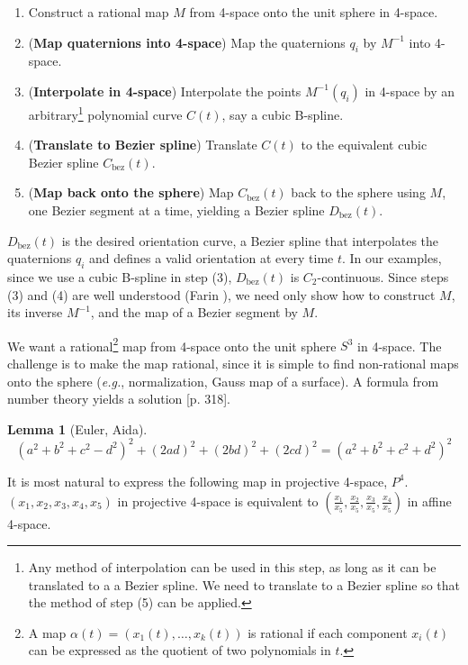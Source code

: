 \documentclass[times]{article}
\newtheorem{lemma}{Lemma}[section]
\begin{document}
\begin{enumerate}
\item
	Construct a rational map $M$ from 4-space onto the unit sphere in 
	4-space.
\item
	({\bf Map quaternions into 4-space})
	Map the quaternions $q_i$ by $M^{-1}$ into 4-space.
\item
	({\bf Interpolate in 4-space})
	Interpolate the points $M^{-1}(q_i)$ in 4-space
	by an arbitrary\footnote{Any method of interpolation 
	can be used in this step, as long as it can be translated to a
	a Bezier spline.  We need to translate to a Bezier spline so that
	the method of step (5) can be applied.}
	polynomial curve $C(t)$, say a cubic B-spline.
\item
	({\bf Translate to Bezier spline})
	Translate $C(t)$ to the equivalent cubic Bezier spline 
	$C_{\mbox{bez}}(t)$.
\item
	({\bf Map back onto the sphere})
	Map $C_{\mbox{bez}}(t)$ back to the sphere using $M$, 
	one Bezier segment at a time, yielding a  
	Bezier spline $D_{\mbox{bez}}(t)$. 
\end{enumerate}

$D_{\mbox{bez}}(t)$ is the desired orientation curve, a Bezier spline
that interpolates the quaternions $q_i$ and defines a valid orientation
at every time $t$.
In our examples, since we use a cubic B-spline in step (3),
$D_{\mbox{bez}}(t)$ is $C_2$-continuous.
Since steps (3) and (4) are well understood (Farin \cite{farin93}),
we need only show how to construct $M$, its inverse $M^{-1}$,
and the map of a Bezier segment by $M$.

We want a rational\footnote{A map $\alpha(t) = (x_1(t),\ldots,x_k(t))$
	is rational if each component $x_i(t)$ can be expressed
	as the quotient of two polynomials in $t$.}
map from 4-space onto the unit sphere $S^3$ in
4-space.
The challenge is to make the map rational,
since it is simple to find non-rational maps onto the sphere 
({\em e.g.}, normalization, Gauss map of a surface).
A formula from number theory yields a solution
\cite{Dickson52}[p. 318].

\begin{lemma}[Euler, Aida]
\begin{equation}
\label{eqn:aida}
(a^2 + b^2 + c^2 - d^2)^2 + (2ad)^2 + (2bd)^2 + (2cd)^2 = 
(a^2 + b^2 + c^2 + d^2)^2
\end{equation}
\end{lemma}

It is most natural to express the following map in projective 4-space, $P^4$.
$(x_1,x_2,x_3,x_4,x_5)$ in projective 4-space is equivalent to
$(\frac{x_1}{x_5},\frac{x_2}{x_5},\frac{x_3}{x_5},\frac{x_4}{x_5})$ 
in affine 4-space.
\end{document}
